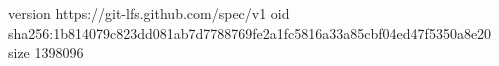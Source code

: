 version https://git-lfs.github.com/spec/v1
oid sha256:1b814079c823dd081ab7d7788769fe2a1fc5816a33a85cbf04ed47f5350a8e20
size 1398096
